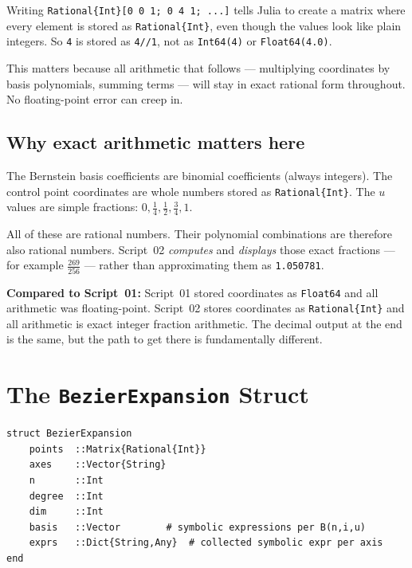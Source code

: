 \documentclass[12pt, a4paper]{article}
\newcommand{\cd}[1]{\texttt{#1}}
\begin{document}
Writing \cd{Rational\{Int\}[0 0 1; 0 4 1; ...]} tells Julia
to create a matrix where every element is stored as
\cd{Rational\{Int\}}, even though the values look like plain integers.
So \cd{4} is stored as \cd{4//1}, not as \cd{Int64(4)} or
\cd{Float64(4.0)}.

This matters because all arithmetic that follows --- multiplying
coordinates by basis polynomials, summing terms --- will stay
in exact rational form throughout.
No floating-point error can creep in.

\subsection{Why exact arithmetic matters here}

The Bernstein basis coefficients are binomial coefficients
(always integers).
The control point coordinates are whole numbers stored as
\cd{Rational\{Int\}}.
The $u$ values are simple fractions: $0, \tfrac{1}{4}, \tfrac{1}{2},
\tfrac{3}{4}, 1$.

All of these are rational numbers.
Their polynomial combinations are therefore also rational numbers.
Script~02 \emph{computes} and \emph{displays} those exact fractions
--- for example $\frac{269}{256}$ --- rather than approximating
them as \cd{1.050781}.

\begin{diffbox}
\textbf{Compared to Script~01:}
Script~01 stored coordinates as \cd{Float64} and all arithmetic
was floating-point.
Script~02 stores coordinates as \cd{Rational\{Int\}} and all
arithmetic is exact integer fraction arithmetic.
The decimal output at the end is the same, but the
path to get there is fundamentally different.
\end{diffbox}


\section{The \texttt{BezierExpansion} Struct}

\begin{verbatim}
struct BezierExpansion
    points  ::Matrix{Rational{Int}}
    axes    ::Vector{String}
    n       ::Int
    degree  ::Int
    dim     ::Int
    basis   ::Vector        # symbolic expressions per B(n,i,u)
    exprs   ::Dict{String,Any}  # collected symbolic expr per axis
end
\end{verbatim}
\end{document}

